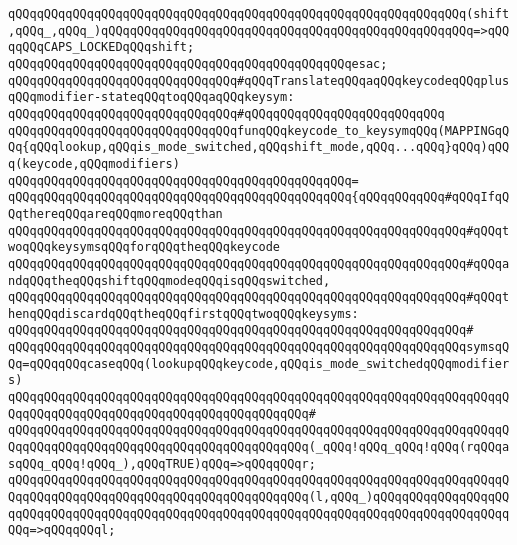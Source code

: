 \verb|qQQqqQQqqQQqqQQqqQQqqQQqqQQqqQQqqQQqqQQqqQQqqQQqqQQqqQQqqQQqqQQq(shift,qQQq_,qQQq_)qQQqqQQqqQQqqQQqqQQqqQQqqQQqqQQqqQQqqQQqqQQqqQQqqQQq=>qQQqqQQqCAPS_LOCKEDqQQqshift;|\newline
\verb|qQQqqQQqqQQqqQQqqQQqqQQqqQQqqQQqqQQqqQQqqQQqqQQqesac;|\newline
\newline
\verb|qQQqqQQqqQQqqQQqqQQqqQQqqQQqqQQq#qQQqTranslateqQQqaqQQqkeycodeqQQqplusqQQqmodifier-stateqQQqtoqQQqaqQQqkeysym:|\newline
\verb|qQQqqQQqqQQqqQQqqQQqqQQqqQQqqQQq#qQQqqQQqqQQqqQQqqQQqqQQqqQQq|\newline
\verb|qQQqqQQqqQQqqQQqqQQqqQQqqQQqqQQqfunqQQqkeycode_to_keysymqQQq(MAPPINGqQQq{qQQqlookup,qQQqis_mode_switched,qQQqshift_mode,qQQq...qQQq}qQQq)qQQq(keycode,qQQqmodifiers)|\newline
\verb|qQQqqQQqqQQqqQQqqQQqqQQqqQQqqQQqqQQqqQQqqQQqqQQq=|\newline
\verb|qQQqqQQqqQQqqQQqqQQqqQQqqQQqqQQqqQQqqQQqqQQqqQQq{qQQqqQQqqQQq#qQQqIfqQQqthereqQQqareqQQqmoreqQQqthan|\newline
\verb|qQQqqQQqqQQqqQQqqQQqqQQqqQQqqQQqqQQqqQQqqQQqqQQqqQQqqQQqqQQqqQQq#qQQqtwoqQQqkeysymsqQQqforqQQqtheqQQqkeycode|\newline
\verb|qQQqqQQqqQQqqQQqqQQqqQQqqQQqqQQqqQQqqQQqqQQqqQQqqQQqqQQqqQQqqQQq#qQQqandqQQqtheqQQqshiftqQQqmodeqQQqisqQQqswitched,|\newline
\verb|qQQqqQQqqQQqqQQqqQQqqQQqqQQqqQQqqQQqqQQqqQQqqQQqqQQqqQQqqQQqqQQq#qQQqthenqQQqdiscardqQQqtheqQQqfirstqQQqtwoqQQqkeysyms:|\newline
\verb|qQQqqQQqqQQqqQQqqQQqqQQqqQQqqQQqqQQqqQQqqQQqqQQqqQQqqQQqqQQqqQQq#|\newline
\verb|qQQqqQQqqQQqqQQqqQQqqQQqqQQqqQQqqQQqqQQqqQQqqQQqqQQqqQQqqQQqqQQqsymsqQQq=qQQqqQQqcaseqQQq(lookupqQQqkeycode,qQQqis_mode_switchedqQQqmodifiers)|\newline
\verb|qQQqqQQqqQQqqQQqqQQqqQQqqQQqqQQqqQQqqQQqqQQqqQQqqQQqqQQqqQQqqQQqqQQqqQQqqQQqqQQqqQQqqQQqqQQqqQQqqQQqqQQqqQQqqQQq#|\newline
\verb|qQQqqQQqqQQqqQQqqQQqqQQqqQQqqQQqqQQqqQQqqQQqqQQqqQQqqQQqqQQqqQQqqQQqqQQqqQQqqQQqqQQqqQQqqQQqqQQqqQQqqQQqqQQqqQQq(_qQQq!qQQq_qQQq!qQQq(rqQQqasqQQq_qQQq!qQQq_),qQQqTRUE)qQQq=>qQQqqQQqr;|\newline
\verb|qQQqqQQqqQQqqQQqqQQqqQQqqQQqqQQqqQQqqQQqqQQqqQQqqQQqqQQqqQQqqQQqqQQqqQQqqQQqqQQqqQQqqQQqqQQqqQQqqQQqqQQqqQQqqQQq(l,qQQq_)qQQqqQQqqQQqqQQqqQQqqQQqqQQqqQQqqQQqqQQqqQQqqQQqqQQqqQQqqQQqqQQqqQQqqQQqqQQqqQQqqQQqqQQqqQQq=>qQQqqQQql;|\newline
